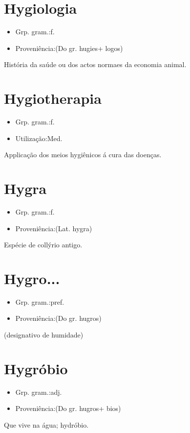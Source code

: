 \documentclass{article}
\begin{document}
\section{Hygiologia}
\begin{itemize}
\item {Grp. gram.:f.}
\end{itemize}
\begin{itemize}
\item {Proveniência:(Do gr. \textunderscore hugies\textunderscore  + \textunderscore logos\textunderscore )}
\end{itemize}
História da saúde ou dos actos normaes da economia animal.
\section{Hygiotherapia}
\begin{itemize}
\item {Grp. gram.:f.}
\end{itemize}
\begin{itemize}
\item {Utilização:Med.}
\end{itemize}
Applicação dos meios hygiênicos á cura das doenças.
\section{Hygra}
\begin{itemize}
\item {Grp. gram.:f.}
\end{itemize}
\begin{itemize}
\item {Proveniência:(Lat. \textunderscore hygra\textunderscore )}
\end{itemize}
Espécie de collýrio antigo.
\section{Hygro...}
\begin{itemize}
\item {Grp. gram.:pref.}
\end{itemize}
\begin{itemize}
\item {Proveniência:(Do gr. \textunderscore hugros\textunderscore )}
\end{itemize}
(designativo de \textunderscore humidade\textunderscore )
\section{Hygróbio}
\begin{itemize}
\item {Grp. gram.:adj.}
\end{itemize}
\begin{itemize}
\item {Proveniência:(Do gr. \textunderscore hugros\textunderscore  + \textunderscore bios\textunderscore )}
\end{itemize}
Que vive na água; hydróbio.
\end{document}
